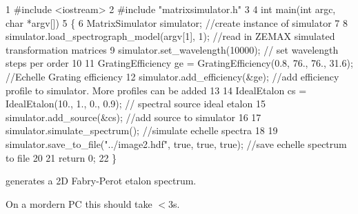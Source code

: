 
\begin{DoxyCode}
1 #include <iostream>
2 #include "matrixsimulator.h"
3 
4 int main(int argc, char *argv[])
5 \{
6 MatrixSimulator simulator;  //create instance of simulator
7 
8 simulator.load\_spectrograph\_model(argv[1], 1);  //read in ZEMAX simulated transformation matrices
9 simulator.set\_wavelength(10000); // set wavelength steps per order
10 
11 GratingEfficiency ge = GratingEfficiency(0.8, 76., 76., 31.6); //Echelle Grating efficiency
12 simulator.add\_efficiency(&ge); //add efficiency profile to simulator. More profiles can be added
13 
14 IdealEtalon cs = IdealEtalon(10., 1., 0., 0.9); // spectral source ideal etalon
15 simulator.add\_source(&cs); //add source to simulator
16 
17 simulator.simulate\_spectrum(); //simulate echelle spectra 
18 
19 simulator.save\_to\_file("../image2.hdf", true, true, true); //save echelle spectrum to file
20 
21 return 0;
22 \}
\end{DoxyCode}


generates a 2D Fabry-\/\+Perot etalon spectrum.

On a mordern PC this should take $<$3s. 